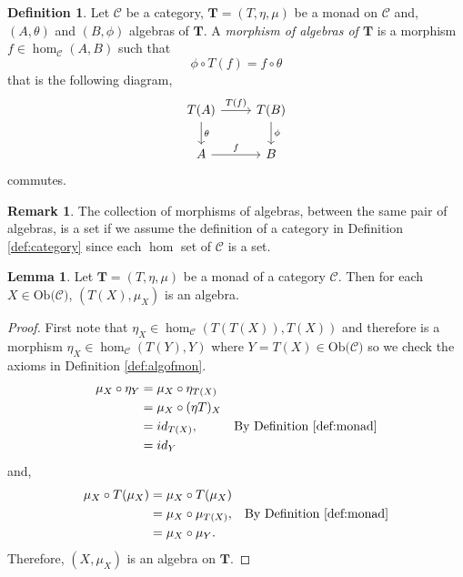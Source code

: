 \documentclass[11pt,a4paper]{article}
\theoremstyle{definition}
\newtheorem{lemma}[thm]{Lemma}
\newtheorem{definition}[thm]{Definition}
\newtheorem{remark}[thm]{Remark}
\newcommand\ho[3][]{\hom_{#1}(#2,#3)}
\newcommand\ob[1]{\mathrm{Ob(}#1\mathrm{)}}
\newcommand\cat[1]{\mathscr{#1}}
\numberwithin{equation}{section}
\begin{document}
\begin{definition}
    \label{def:monalgmorph}
    Let $\cat{C}$ be a category, $\mathbf{T}=(T,\eta,\mu)$ be a monad on $\cat{C}$ and, $(A,\theta)$ and $(B,\phi)$ algebras of $\mathbf{T}$. A \emph{morphism of algebras of $\mathbf{T}$} is a morphism $f\in\ho[\cat{C}]{A}{B}$ such that
    \[\phi\circ T(f) = f\circ\theta\]
    that is the following diagram,
    \begin{equation*}
        \begin{tikzcd}
            T(A) \arrow[r,"T(f)"] \arrow[d , "\theta"] & T(B) \arrow[d,"\phi"]\\
            A \arrow[r,"f"] & B
        \end{tikzcd}
    \end{equation*}
    commutes.
\end{definition}
\begin{remark}
    The collection of morphisms of algebras, between the same pair of algebras, is  a set if we assume the definition of a category in Definition \ref{def:category} since each $\hom$ set of $\cat{C}$ is a set.
\end{remark}
\begin{lemma}
    \label{lem:muisalg}
    Let $\mathbf{T} = (T,\eta,\mu)$ be a monad of a category $\cat{C}$. Then for each $X\in\ob{\cat{C}}$, $(T(X), \mu_{X})$ is an algebra.
\end{lemma}
\begin{proof}
    First note that $\eta_X\in\ho[\cat{C}]{T(T(X))}{T(X)}$ and therefore is a morphism $\eta_{X}\in\ho[\cat{C}]{T(Y)}{Y}$ where $Y=T(X)\in\ob{\cat{C}}$ so we check the axioms in Definition \ref{def:algofmon}.
    \begin{align*}
        \mu_{X} \circ \eta_{Y} &= \mu_{X}\circ \eta_{T(X)} \\
        &= \mu_{X} \circ (\eta T)_{X} \\
        &= id_{T(X)}, & \text{By Definition \ref{def:monad}} \\
        &= id_{Y}
    \end{align*}
    and,
    \begin{align*}
        \mu_{X} \circ T(\mu_{X}) &= \mu_{X} \circ T(\mu_{X}) \\
        &= \mu_{X} \circ \mu_{T(X)}, & \text{By Definition \ref{def:monad}} \\
        &= \mu_{X} \circ \mu_{Y}.
    \end{align*}
    Therefore, $(X,\mu_X)$ is an algebra on $\mathbf{T}$.
\end{proof}
\end{document}
